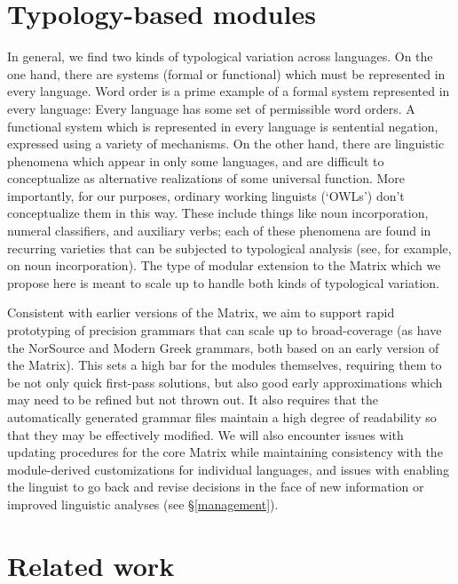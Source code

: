 \documentclass[11pt]{article}
\begin{document}
\section{Typology-based modules}

In general, we find two kinds of typological variation across
languages.  On the one hand, there are systems (formal or functional)
which must be represented in every language.  Word order is a prime
example of a formal system represented in every language: Every
language has some set of permissible word orders.
A functional system which is represented in every language is
sentential negation, expressed using a variety of mechanisms.  On 
the other hand, there are linguistic
phenomena which appear in only some languages, and are difficult to
conceptualize as alternative realizations of some universal function.  More
importantly, for our purposes, ordinary working linguists (`OWLs')
don't conceptualize them in this way.  These include things like
noun incorporation, numeral classifiers, and auxiliary verbs; each of
these phenomena are found in recurring varieties that can be 
subjected to typological
analysis (see, for example, \cite{Mithun:84} on noun incorporation).
The type of modular extension to the Matrix which we propose here
is meant to scale up to handle both kinds of typological variation.

Consistent with earlier versions of the Matrix, we aim to support 
rapid prototyping of precision grammars that can scale up to
broad-coverage (as have the NorSource \cite{Hel:Hau:03} and
Modern Greek \cite{Kor:Neu:2003} grammars, both based on an early
version of the Matrix). This sets a high bar for the modules
themselves, requiring them to be not only quick first-pass solutions,
but also good early approximations which may need to be refined but not
thrown out.  It also requires that the automatically generated grammar
files maintain a high degree of readability so that they may be
effectively modified.  We will also encounter issues with updating
procedures for the core Matrix while maintaining consistency with the
module-derived customizations for individual languages, and issues
with enabling the linguist to go back and revise decisions in the face
of new information or improved linguistic analyses (see \S\ref{management}).

\section{Related work}
\end{document}
